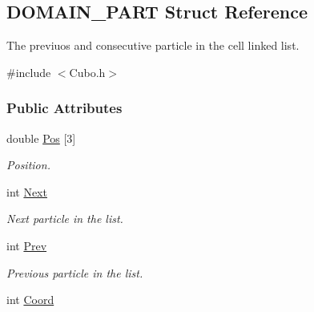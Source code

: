 \hypertarget{structDOMAIN__PART}{\subsection{\-D\-O\-M\-A\-I\-N\-\_\-\-P\-A\-R\-T \-Struct \-Reference}
\label{structDOMAIN__PART}
}


\-The previuos and consecutive particle in the cell linked list.  




{\ttfamily \#include $<$\-Cubo.\-h$>$}

\subsubsection*{\-Public \-Attributes}
\begin{DoxyCompactItemize}
\item 
\hypertarget{structDOMAIN__PART_a863738e46f14b3bfc674ad87d35f143d}{double \hyperlink{structDOMAIN__PART_a863738e46f14b3bfc674ad87d35f143d}{\-Pos} \mbox{[}3\mbox{]}}\label{structDOMAIN__PART_a863738e46f14b3bfc674ad87d35f143d}

\begin{DoxyCompactList}\small\item\em \-Position. \end{DoxyCompactList}\item 
\hypertarget{structDOMAIN__PART_af494e3edb0fc7a8ffb49eb0fa81e3163}{int \hyperlink{structDOMAIN__PART_af494e3edb0fc7a8ffb49eb0fa81e3163}{\-Next}}\label{structDOMAIN__PART_af494e3edb0fc7a8ffb49eb0fa81e3163}

\begin{DoxyCompactList}\small\item\em \-Next particle in the list. \end{DoxyCompactList}\item 
\hypertarget{structDOMAIN__PART_a4b1223f434a5fe652ae0702f01801684}{int \hyperlink{structDOMAIN__PART_a4b1223f434a5fe652ae0702f01801684}{\-Prev}}\label{structDOMAIN__PART_a4b1223f434a5fe652ae0702f01801684}

\begin{DoxyCompactList}\small\item\em \-Previous particle in the list. \end{DoxyCompactList}\item 
\hypertarget{structDOMAIN__PART_ac78d2677b472306ff175386fdda521d5}{int \hyperlink{structDOMAIN__PART_ac78d2677b472306ff175386fdda521d5}{\-Coord}}\label{structDOMAIN__PART_ac78d2677b472306ff175386fdda521d5}


\end{DoxyCompactItemize}
